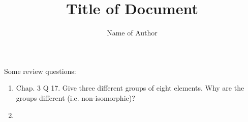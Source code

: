 \documentclass{article}
\title{Title of Document}
\author{Name of Author}
\begin{document}
Some review questions:

\begin{enumerate}
\item
Chap. 3 Q 17. Give three different groups of eight elements. Why are the groups different (i.e. non-isomorphic)?
\item



\end{enumerate}
\end{document}
